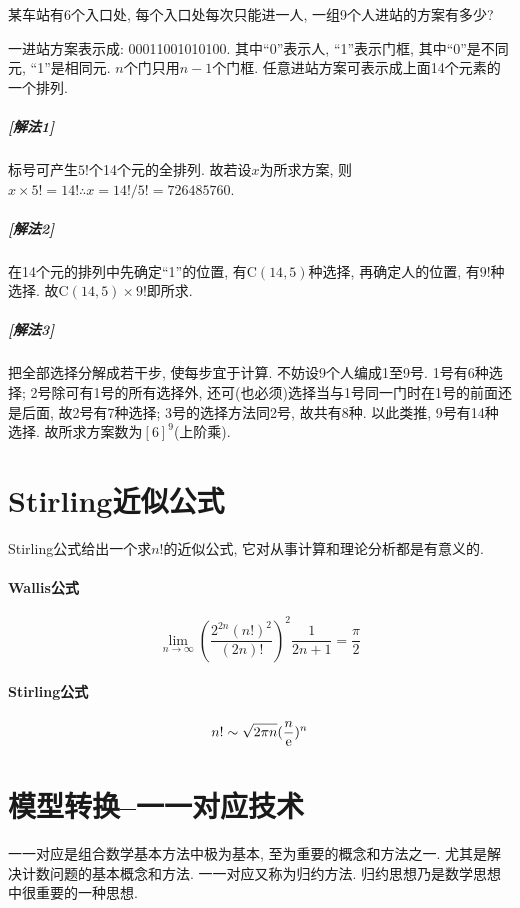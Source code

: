         \begin{example}
            某车站有6个入口处, 每个入口处每次只能进一人, 一组9个人进站的方案有多少? 

            \begin{sol}
                一进站方案表示成: 00011001010100. 其中``0''表示人, ``1''表示门框, 其中``0''是不同元, ``1''是相同元. $n$个门只用$n-1$个门框. 任意进站方案可表示成上面14个元素的一个排列. 
                \subparagraph{\rm\textbf{[解法1]}} 标号可产生$5!$个14个元的全排列. 故若设$x$为所求方案, 则$x\times5!=14!\therefore x=14!/5!=726485760$.
                \subparagraph{\rm\textbf{[解法2]}} 在14个元的排列中先确定``1''的位置, 有C$(14,5)$种选择, 再确定人的位置, 有$9!$种选择. 故C$(14,5)\times9!$即所求. 
                \subparagraph{\rm\textbf{[解法3]}} 把全部选择分解成若干步, 使每步宜于计算. 不妨设9个人编成1至9号. 1号有6种选择; 2号除可有1号的所有选择外, 还可(也必须)选择当与1号同一门时在1号的前面还是后面, 故2号有7种选择; 3号的选择方法同2号, 故共有8种. 以此类推, 9号有14种选择. 故所求方案数为$[6]^9$(上阶乘). 
            \end{sol}
        \end{example}

\section{Stirling近似公式}

    \textsf{Stirling公式}给出一个求$n!$的近似公式, 它对从事计算和理论分析都是有意义的. 

    \paragraph{Wallis公式}

        \[\lim_{n\to\infty}(\frac{2^{2n}(n!)^2}{(2n)!})^2\frac{1}{2n+1}=\frac{\pi}{2}\]

    \paragraph{Stirling公式}

        \[n!\sim\sqrt{2\pi n}({n\over \mathrm{e}})^n\]

\section{模型转换--一一对应技术}

    \textsf{一一对应}是组合数学基本方法中极为基本, 至为重要的概念和方法之一. 尤其是解决计数问题的基本概念和方法. 一一对应又称为\textsf{归约方法}. 归约思想乃是数学思想中很重要的一种思想. 

